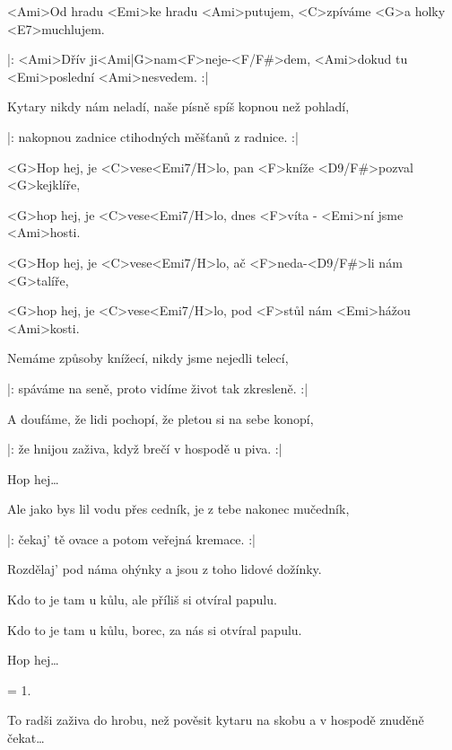 

\zs
<Ami>Od hradu <Emi>ke hradu <Ami>putujem,
<C>zpíváme <G>a holky <E7>muchlujem.

|: <Ami>Dřív ji<Ami|G>nam\quad <F>neje-<F/F#>dem,
<Ami>dokud tu <Emi>poslední <Ami>nesvedem. :|
\ks

\zs
Kytary nikdy nám neladí,
naše písně spíš kopnou než pohladí,

|: nakopnou zadnice
ctihodných měšťanů z radnice. :|
\ks

\zr
<G>Hop hej, je <C>vese<Emi7/H>lo,
pan <F>kníže <D9/F#>pozval <G>kejklíře,

<G>hop hej, je <C>vese<Emi7/H>lo,
dnes <F>víta - <Emi>ní jsme <Ami>hosti.

<G>Hop hej, je <C>vese<Emi7/H>lo,
ač <F>neda-<D9/F#>li nám <G>talíře,

<G>hop hej, je <C>vese<Emi7/H>lo,
pod <F>stůl nám <Emi>hážou <Ami>kosti.
\kr

\zs
Nemáme způsoby knížecí,
nikdy jsme nejedli telecí,

|: spáváme na seně,
proto vidíme život tak zkresleně. :|
\ks

\zs
A doufáme, že lidi pochopí,
že pletou si na sebe konopí,

|: že hnijou zaživa,
když brečí v hospodě u piva. :|
\ks

\zr
Hop hej…
\kr

\zs
Ale jako bys lil vodu přes cedník,
je z tebe nakonec mučedník,

|: čekaj' tě ovace
a potom veřejná kremace. :|
\ks

\zs
Rozdělaj' pod náma ohýnky
a jsou z toho lidové dožínky.

Kdo to je tam u kůlu,
ale příliš si otvíral papulu.

Kdo to je tam u kůlu,
borec, za nás si otvíral papulu.
\ks

\zr
Hop hej…
\kr

\zs
= 1.
\ks

\zs
To radši zaživa do hrobu,
než pověsit kytaru na skobu
a v hospodě znuděně čekat…
\ks

\kp
